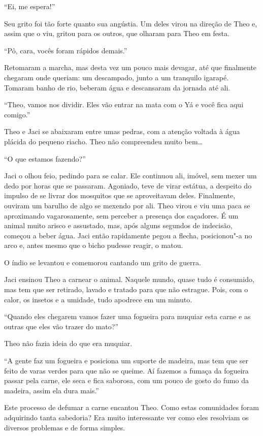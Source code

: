 ``Ei, me espera!''

Seu grito foi tão forte quanto sua angústia. Um deles virou na direção
de Theo e, assim que o viu, gritou para os outros, que olharam para
Theo em festa.

``Pô, cara, vocês foram rápidos demais.''

Retomaram a marcha, mas desta vez um pouco mais devagar, até que
finalmente chegaram onde queriam: um descampado, junto a um tranquilo
igarapé. Tomaram banho de rio, beberam água e descansaram da jornada até
ali.

``Theo, vamos nos dividir. Eles vão entrar na mata com o Yá e você fica
aqui comigo.''

Theo e Jaci se abaixaram entre umas pedras, com a atenção voltada à água
plácida do pequeno riacho. Theo não compreendeu muito bem\ldots{}

``O que estamos fazendo?''

Jaci o olhou feio, pedindo para se calar. Ele continuou ali, imóvel, sem
mexer um dedo por horas que se passaram. Agoniado, teve de virar estátua, a
despeito do impulso de se livrar dos mosquitos que se aproveitavam
deles. Finalmente, ouviram um barulho de algo se mexendo por ali. Theo
virou e viu uma paca se aproximando vagarosamente, sem perceber a presença dos
caçadores. É um animal muito
arisco e assustado, mas, após alguns segundos de indecisão, começou a
beber água. Jaci então rapidamente pegou a flecha, posicionou"-a no arco
e, antes mesmo que o bicho pudesse reagir, o matou.

O índio se levantou e comemorou cantando um grito de guerra.

Jaci ensinou Theo a carnear o animal. Naquele mundo, quase tudo
é consumido, mas tem que ser retirado, lavado e tratado para que não
estrague. Pois, com o calor, os insetos e a umidade, tudo apodrece em
um minuto.

``Quando eles chegarem vamos fazer uma fogueira para muquiar esta carne e
as outras que eles vão trazer do mato?''

Theo não fazia ideia do que era muquiar.

``A gente faz um fogueira e posiciona um suporte de madeira, mas tem que
ser feito de varas verdes para que não se queime. Aí fazemos a fumaça da
fogueira passar pela carne, ele seca e fica saborosa, com um pouco de
gosto do fumo da madeira, assim ela dura mais.''

Este processo de defumar a carne encantou Theo. Como estas
comunidades foram adquirindo tanta sabedoria? Era muito interessante ver
como eles resolviam os diversos problemas e de forma simples.

